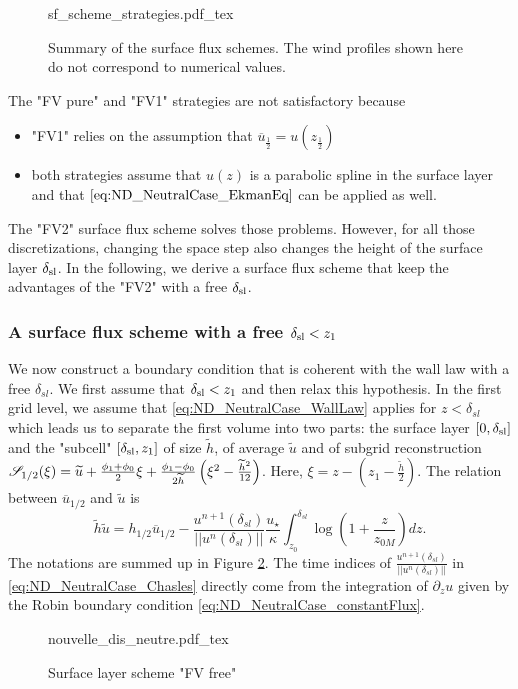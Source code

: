\begin{figure}
	\centering
	{sf_scheme_strategies.pdf_tex}
	\caption{Summary of the surface flux schemes. The
	wind profiles shown here do not correspond to
	numerical values.}
	\label{fig:ND_NeutralCase_summary_sfscheme}
\end{figure}

The "FV pure" and "FV1" strategies are not satisfactory because
\begin{itemize}
	\item "FV1" relies on the assumption that $\overline{u}_{\frac{1}{2}} = u(z_{\frac{1}{2}})$
	\item both strategies assume that $u(z)$ is a parabolic spline in the surface layer and that $\eqref{eq:ND_NeutralCase_EkmanEq}$
		can be applied as well.
\end{itemize}
The "FV2" surface flux scheme solves those problems.
However, for all those discretizations, changing the space step
also changes the height of the surface layer $\delta_{\rm sl}$.
In the following, we derive a surface flux scheme that keep
the advantages of the "FV2" with a free $\delta_{\rm sl}$.

\subsubsection{A surface flux scheme with a free $\delta_{\rm sl}<z_1$}
We now construct a boundary condition that is coherent
with the wall law with a free $\delta_{sl}$. We first assume
that $\delta_{\rm sl} < z_1$ and then relax this hypothesis.
In the first grid level, we assume that
\eqref{eq:ND_NeutralCase_WallLaw} applies for $z<\delta_{sl}$
which leads us to separate the 
first volume into two parts: the surface layer $[0,\delta_{\rm sl}]$ and the "subcell" $[\delta_{\rm sl}, z_1]$ of size $\widetilde{h}$, of average $\widetilde{u}$
and of subgrid reconstruction
${\cal S}_{1/2}(\xi) = \widetilde{u} + \frac{\phi_{1} + \phi_{0}}{2} \xi
+ \frac{\phi_{1} - \phi_{0}}{2\widetilde{h}}\left(\xi^2 - \frac{\widetilde{h}^2}{12}\right)
$.
Here, $\xi = z - (z_1 - \frac{\widetilde{h}}{2})$.
The relation between $\overline{u}_{1/2}$ and $\widetilde{u}$ is 
\begin{equation}
\label{eq:ND_NeutralCase_Chasles}
	\widetilde{h}\widetilde{u} = h_{1/2}\overline{u}_{1/2} - \frac{u^{n+1}(\delta_{sl})}{||u^n(\delta_{sl})||}\frac{{u_\star}}{\kappa}\int_{z_0}^{\delta_{sl}} \log(1+\frac{z}{z_{0M}}) dz.
\end{equation}
The notations are summed up in Figure
\ref{fig:ND_NeutralCase_nouvelle_dis_neutre}.
The time indices of $\frac{u^{n+1}(\delta_{sl})}{||u^n(\delta_{sl})||}$
in \eqref{eq:ND_NeutralCase_Chasles} directly come from the integration 
of $\partial_z u$ given by the Robin boundary
condition \eqref{eq:ND_NeutralCase_constantFlux}.
\begin{figure}
	{nouvelle_dis_neutre.pdf_tex}
	\caption{Surface layer scheme "FV free"}
	\label{fig:ND_NeutralCase_nouvelle_dis_neutre}
\end{figure}


